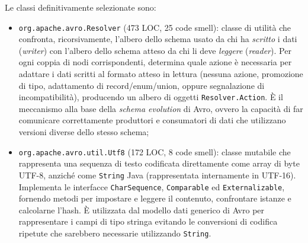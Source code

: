 Le classi definitivamente selezionate sono:
\begin{itemize}
    \item \texttt{org.apache.avro.Resolver} (473 LOC, 25 code smell):
    classe di utilità che confronta, ricorsivamente, l'albero dello
    schema usato da chi ha \emph{scritto} i dati (\emph{writer}) con
    l'albero dello schema atteso da chi li deve \emph{leggere}
    (\emph{reader}). Per ogni coppia di nodi corrispondenti, determina
    quale azione è necessaria per adattare i dati scritti al formato
    atteso in lettura (nessuna azione, promozione di tipo, adattamento
    di record/enum/union, oppure segnalazione di incompatibilità),
    producendo un albero di oggetti \texttt{Resolver.Action}. È il
    meccanismo alla base della \emph{schema evolution} di Avro, ovvero
    la capacità di far comunicare correttamente produttori e
    consumatori di dati che utilizzano versioni diverse dello stesso
    schema;
    \item \texttt{org.apache.avro.util.Utf8} (172 LOC, 8 code smell):
    classe mutabile che rappresenta una sequenza di testo codificata
    direttamente come array di byte UTF-8, anziché come \texttt{String}
    Java (rappresentata internamente in UTF-16). Implementa le
    interfacce \texttt{CharSequence}, \texttt{Comparable} ed
    \texttt{Externalizable}, fornendo metodi per impostare e leggere il
    contenuto, confrontare istanze e calcolarne l'hash. È utilizzata dal
    modello dati generico di Avro per rappresentare i campi di tipo
    stringa evitando le conversioni di codifica ripetute che
    sarebbero necessarie utilizzando \texttt{String}.
\end{itemize}